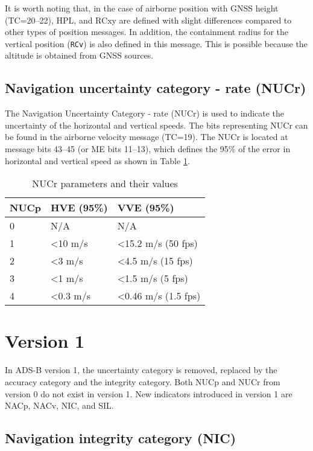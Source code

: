 It is worth noting that, in the case of airborne position with GNSS height (TC=20--22), HPL, and RCxy are defined with slight differences compared to other types of position messages. In addition, the containment radius for the vertical position (\texttt{RCv}) is also defined in this message. This is possible because the altitude is obtained from GNSS sources.


\subsection{Navigation uncertainty category - rate (NUCr)}

The Navigation Uncertainty Category - rate (NUCr) is used to indicate the uncertainty of the horizontal and vertical speeds. The bits representing NUCr can be found in the airborne velocity message (TC=19). The NUCr is located at message bits 43--45 (or ME bits 11--13), which defines the 95\% of the error in horizontal and vertical speed as shown in Table \ref{tb:nucr-params}.

\begin{table}[ht]
\caption{NUCr parameters and their values}
\label{tb:nucr-params}
\begin{tabular}{|l|l|l|}
\hline
\textbf{NUCp} & \textbf{HVE (95\%)} & \textbf{VVE (95\%)} \\ \hline
0 & N/A & N/A \\ \hline
1 & \textless 10 m/s & \textless 15.2 m/s (50 fps) \\ \hline
2 & \textless 3 m/s & \textless 4.5 m/s (15 fps) \\ \hline
3 & \textless 1 m/s & \textless 1.5 m/s (5 fps) \\ \hline
4 & \textless 0.3 m/s & \textless 0.46 m/s (1.5 fps) \\ \hline
\end{tabular}
\end{table}



\section{Version 1}


In ADS-B version 1, the uncertainty category is removed, replaced by the accuracy category and the integrity category. Both NUCp and NUCr from version 0 do not exist in version 1. New indicators introduced in version 1 are NACp, NACv, NIC, and SIL.


\subsection{Navigation integrity category (NIC)}

